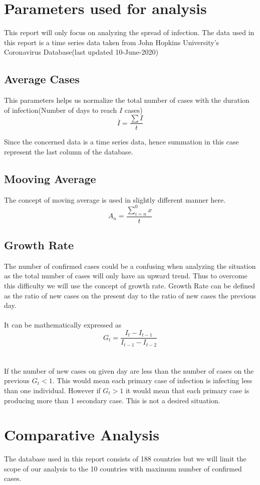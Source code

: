 \documentclass[12pt, twosided]{report}  %
\begin{document}
\section{Parameters used for analysis}
This report will only focus on analyzing the spread of infection. The data used in this report is a time series data taken from John Hopkins University's Coronavirus Database(last updated 10-June-2020)

\subsection*{Average Cases}
This parameters helps us normalize the total number of cases with the duration of infection(Number of days to reach $I$ cases)
$$ \overline{I} = \frac{\sum I}{t} $$

Since the concerned data is a time series data, hence summation in this case represent the last column of the database.

\subsection*{Mooving Average}
The concept of moving average is used in slightly different manner here.
$$\displaystyle A_n = \frac{\sum_{i=n} ^{0} {x}}{t}$$

\subsection*{Growth Rate}
The number of confirmed cases could be a confusing when analyzing the situation as the total number of cases will only  have an upward trend. Thus to overcome this difficulty we will use the concept of growth rate. Growth Rate can be defined as the ratio of new cases on the present day to the ratio of new cases the previous day.
\\
\\
It can be mathematically expressed as 
$$ G_t = \frac{I_t - I_{t-1}}{I_{t-1}-I_{t-2}}$$
\\ 
\\
If the number of new cases on given day are less than the number of cases on the previous $G_t < 1$. This would mean each primary case of infection is infecting less than one individual. However if $G_t > 1$ it would mean that each primary case is producing more than 1 secondary case. This is not a desired situation.

\section{Comparative Analysis}
The database used in this report consists of 188 countries but we will limit the scope of our analysis to the 10 countries with maximum number of confirmed cases.
\end{document}
